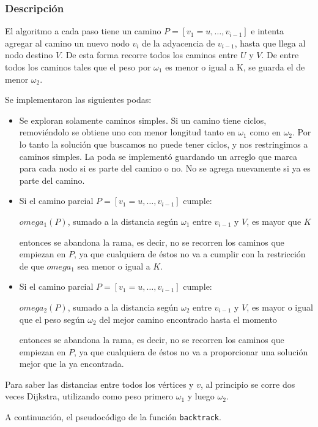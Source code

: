 \subsubsection{Descripción}

El algoritmo a cada paso tiene un camino $P = [v_1 = u, \dots, v_{i-1}]$ e intenta agregar al camino un nuevo nodo $v_i$ de la adyacencia de $v_{i-1}$, hasta que llega al nodo destino $V$. De esta forma recorre todos los caminos entre $U$ y $V$. De entre todos los caminos tales que el peso por $\omega_1$ es menor o igual a K, se guarda el de menor $\omega_2$.

Se implementaron las siguientes podas:

\begin{itemize}
    \item Se exploran solamente caminos simples. Si un camino tiene ciclos, removiéndolo se obtiene uno con menor longitud tanto en $\omega_1$ como en $\omega_2$. Por lo tanto la solución que buscamos no puede tener ciclos, y nos restringimos a caminos simples. La poda se implementó guardando un arreglo que marca para cada nodo si es parte del camino o no. No se agrega nuevamente si ya es parte del camino.
    \item Si el camino parcial $P = [v_1 = u, \dots, v_{i-1}]$ cumple:

        $omega_1(P)$, sumado a la distancia según $\omega_1$ entre $v_{i-1}$ y $V$, es mayor que $K$

entonces se abandona la rama, es decir, no se recorren los caminos que empiezan en $P$, ya que cualquiera de éstos no va a cumplir con la restricción de que $omega_1$ sea menor o igual a $K$.
    \item Si el camino parcial $P = [v_1 = u, \dots, v_{i-1}]$ cumple:

        $omega_2(P)$, sumado a la distancia según $\omega_2$ entre $v_{i-1}$ y $V$, es mayor o igual que el peso según $\omega_2$ del mejor camino encontrado hasta el momento

entonces se abandona la rama, es decir, no se recorren los caminos que empiezan en $P$, ya que cualquiera de éstos no va a proporcionar una solución mejor que la ya encontrada.
\end{itemize}

Para saber las distancias entre todos los vértices y $v$, al principio se corre dos veces Dijkstra, utilizando como peso primero $\omega_1$ y luego $\omega_2$.

A continuaci\'on, el pseudoc\'odigo de la funci\'on \texttt{backtrack}.

